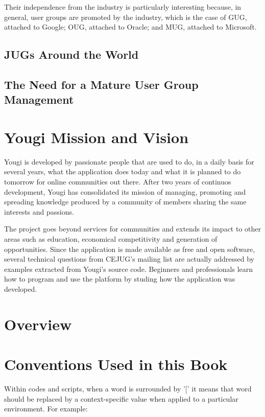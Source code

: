 \documentclass[envcountsame,envcountchap]{svmono}
\begin{document}
Their independence from the industry is particularly interesting because, in general, user groups are promoted by the industry, which is the case of GUG, attached to Google; OUG, attached to Oracle; and MUG, attached to Microsoft.

\subsection{JUGs Around the World}

\subsection{The Need for a Mature User Group Management}

\section{Yougi Mission and Vision}

Yougi is developed by passionate people that are used to do, in a daily basis for several years, what the application does today and what it is planned to do tomorrow for online communities out there. After two years of continuos development, Yougi has consolidated its mission of managing, promoting and spreading knowledge produced by a community of members sharing the same interests and passions.

The project goes beyond services for communities and extends its impact to other areas such as education, economical competitivity and generation of opportunities. Since the application is made available as free and open software, several technical questions from CEJUG's mailing list are actually addressed by examples extracted from Yougi's source code. Beginners and professionals learn how to program and use the platform by studing how the application was developed.

\section{Overview}

\section{Conventions Used in this Book}

Within codes and scripts, when a word is surrounded by '[' it means that word should be replaced by a context-specific value when applied to a particular environment. For example:
\end{document}
